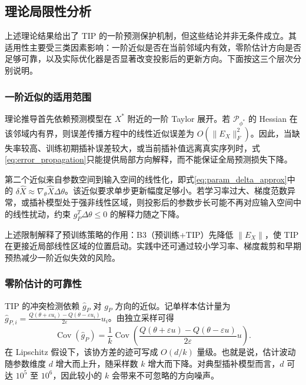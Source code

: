 \documentclass{article}
\begin{document}
\subsection{理论局限性分析}\label{sec:theory_applicability}

上述理论结果给出了 TIP 的一阶预测保护机制，但这些结论并非无条件成立。其适用性主要受三类因素影响：一阶近似是否在当前邻域内有效，零阶估计方向是否足够可靠，以及实际优化器是否显著改变投影后的更新方向。下面按这三个层次分别说明。

\subsubsection{一阶近似的适用范围}

理论推导首先依赖预测模型在 $X^\ast$ 附近的一阶 Taylor 展开。若 $\mathcal{P}_{\phi^\ast}$ 的 Hessian 在该邻域内有界，则误差传播方程中的线性近似误差为 $O(\|E_X\|_F^2)$。因此，当缺失率较高、训练初期插补误差较大，或当前插补值远离真实序列时，式\ref{eq:error_propagation}只能提供局部方向解释，而不能保证全局预测损失下降。

第二个近似来自参数空间到输入空间的线性化，即式\ref{eq:param_delta_approx}中的 $\delta\hat{X}\approx\nabla_\theta\hat{X}\Delta\theta$。该近似要求单步更新幅度足够小。若学习率过大、梯度范数异常，或插补模型处于强非线性区域，则投影后的参数步长可能不再对应输入空间中的线性扰动，约束 $g_P^T\Delta\theta\leq0$ 的解释力随之下降。

上述限制解释了预训练策略的作用：B3（预训练+TIP）先降低 $\|E_X\|$，使 TIP 在更接近局部线性区域的位置启动。实践中还可通过较小学习率、梯度裁剪和早期预热减少一阶近似失效的风险。

\subsubsection{零阶估计的可靠性}

TIP 的冲突检测依赖 $\hat{g}_P$ 对 $g_P$ 方向的近似。记单样本估计量为 $\hat{g}_{P,i} = \frac{Q(\theta+\varepsilon u_i) - Q(\theta-\varepsilon u_i)}{2\varepsilon} u_i$。由独立采样可得
\begin{equation}
	\operatorname{Cov}(\hat{g}_P) = \frac{1}{k}\operatorname{Cov}\!\left(\frac{Q(\theta+\varepsilon u)-Q(\theta-\varepsilon u)}{2\varepsilon}u\right).
\end{equation}
在 Lipschitz 假设下，该协方差的迹可写成 $O(d/k)$ 量级。也就是说，估计波动随参数维度 $d$ 增大而上升，随采样数 $k$ 增大而下降。对典型插补模型而言，$d$ 可达 $10^5$ 至 $10^6$，因此较小的 $k$ 会带来不可忽略的方向噪声。
\end{document}
